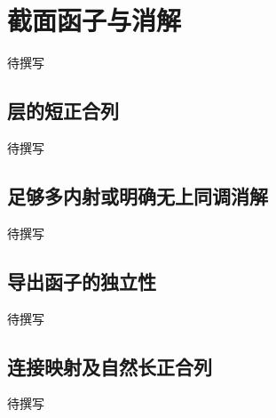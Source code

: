 
% 
% 

\section{截面函子与消解}
\label{g5:sec:1801}

待撰写

\subsection{层的短正合列}
\label{g5:subsec:1801:01}
待撰写

\subsection{足够多内射或明确无上同调消解}
\label{g5:subsec:1801:02}
待撰写

\subsection{导出函子的独立性}
\label{g5:subsec:1801:03}
待撰写

\subsection{连接映射及自然长正合列}
\label{g5:subsec:1801:04}
待撰写
